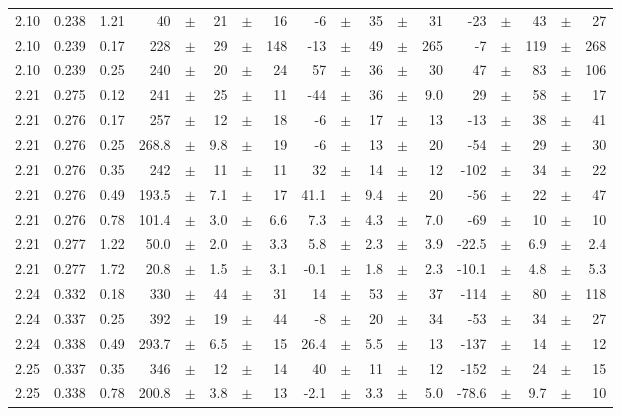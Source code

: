 \documentclass[prc,floatfix,twocolumn,superscriptaddress,letter]{revtex4}
\begin{document}
\begin{longtable}{ccc@{\extracolsep{1cm}}d@{\extracolsep{0pt}}cdcd@{\extracolsep{1cm}}d@{\extracolsep{0pt}}cdcd@{\extracolsep{1cm}}d@{\extracolsep{0pt}}cdcd}
2.10 & 0.238 & 1.21 	&	 40	 &  $\pm$	& 21 &	 $\pm$	& 16 &	 -6 &	$\pm$& 	 35 &	$\pm$& 	 31 & -23 & $\pm$ & 43 & 	$\pm$ & 27\\
2.10 & 0.239 & 0.17 	&	 228	 &  $\pm$	& 29 &	 $\pm$	& 148 &	 -13 &	$\pm$& 	 49 &	$\pm$& 	 265 & -7 & $\pm$ & 119 & 	$\pm$ & 268\\
2.10 & 0.239 & 0.25 	&	 240	 &  $\pm$	& 20 &	 $\pm$	& 24 &	 57 &	$\pm$& 	 36 &	$\pm$& 	 30 & 47 & $\pm$ & 83 & 	$\pm$ & 106\\
2.21 & 0.275 & 0.12 	&	 241	 &  $\pm$	& 25 &	 $\pm$	& 11 &	 -44 &	$\pm$& 	 36 &	$\pm$& 	 9.0 & 29 & $\pm$ & 58 & 	$\pm$ & 17\\
2.21 & 0.276 & 0.17 	&	 257	 &  $\pm$	& 12 &	 $\pm$	& 18 &	 -6 &	$\pm$& 	 17 &	$\pm$& 	 13 & -13 & $\pm$ & 38 & 	$\pm$ & 41\\
2.21 & 0.276 & 0.25 	&	 268.8	 &  $\pm$	& 9.8 &	 $\pm$	& 19 &	 -6 &	$\pm$& 	 13 &	$\pm$& 	 20 & -54 & $\pm$ & 29 & 	$\pm$ & 30\\
2.21 & 0.276 & 0.35 	&	 242	 &  $\pm$	& 11 &	 $\pm$	& 11 &	 32 &	$\pm$& 	 14 &	$\pm$& 	 12 & -102 & $\pm$ & 34 & 	$\pm$ & 22\\
2.21 & 0.276 & 0.49 	&	 193.5	 &  $\pm$	& 7.1 &	 $\pm$	& 17 &	 41.1 &	$\pm$& 	 9.4 &	$\pm$& 	 20 & -56 & $\pm$ & 22 & 	$\pm$ & 47\\
2.21 & 0.276 & 0.78 	&	 101.4	 &  $\pm$	& 3.0 &	 $\pm$	& 6.6 &	 7.3 &	$\pm$& 	 4.3 &	$\pm$& 	 7.0 & -69 & $\pm$ & 10 & 	$\pm$ & 10\\
2.21 & 0.277 & 1.22 	&	 50.0	 &  $\pm$	& 2.0 &	 $\pm$	& 3.3 &	 5.8 &	$\pm$& 	 2.3 &	$\pm$& 	 3.9 & -22.5 & $\pm$ & 6.9 & 	$\pm$ & 2.4\\
2.21 & 0.277 & 1.72 	&	 20.8	 &  $\pm$	& 1.5 &	 $\pm$	& 3.1 &	 -0.1 &	$\pm$& 	 1.8 &	$\pm$& 	 2.3 & -10.1 & $\pm$ & 4.8 & 	$\pm$ & 5.3\\
2.24 & 0.332 & 0.18 	&	 330	 &  $\pm$	& 44 &	 $\pm$	& 31 &	 14 &	$\pm$& 	 53 &	$\pm$& 	 37 & -114 & $\pm$ & 80 & 	$\pm$ & 118\\
2.24 & 0.337 & 0.25 	&	 392	 &  $\pm$	& 19 &	 $\pm$	& 44 &	 -8 &	$\pm$& 	 20 &	$\pm$& 	 34 & -53 & $\pm$ & 34 & 	$\pm$ & 27\\
2.24 & 0.338 & 0.49 	&	 293.7	 &  $\pm$	& 6.5 &	 $\pm$	& 15 &	 26.4 &	$\pm$& 	 5.5 &	$\pm$& 	 13 & -137 & $\pm$ & 14 & 	$\pm$ & 12\\
2.25 & 0.337 & 0.35 	&	 346	 &  $\pm$	& 12 &	 $\pm$	& 14 &	 40 &	$\pm$& 	 11 &	$\pm$& 	 12 & -152 & $\pm$ & 24 & 	$\pm$ & 15\\
2.25 & 0.338 & 0.78 	&	 200.8	 &  $\pm$	& 3.8 &	 $\pm$	& 13 &	 -2.1 &	$\pm$& 	 3.3 &	$\pm$& 	 5.0 & -78.6 & $\pm$ & 9.7 & 	$\pm$ & 10\\

\end{longtable}
\end{document}
